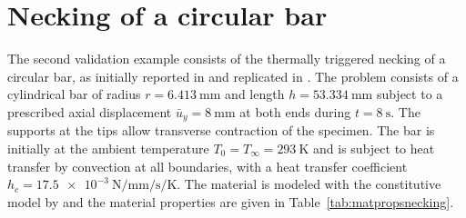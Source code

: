 \section{Necking of a circular bar}
\label{sec:mech-driv-probl}

The second validation example consists of the thermally triggered necking of a circular bar, as initially reported in \cite{simo_associative_1992} and replicated in \cite{danowski_computational_2014}.
The problem consists of a cylindrical bar of radius $r=\SI{6.413}{\milli\meter}$ and length $h=\SI{53.334}{\milli\meter}$ subject to a prescribed axial displacement $\bar{u}_{y}=\SI{8}{\milli\meter}$ at both ends during $t=\SI{8}{\second}$.
The supports at the tips allow transverse contraction of the specimen.
The bar is initially at the ambient temperature $T_{0}=T_{\infty}=\SI{293}{\kelvin}$ and is subject to heat transfer by convection at all boundaries, with a heat transfer coefficient $h_{c} = \SI{17.5e-3}{\newton\per\milli\meter\per\second\per\kelvin}$.
The material is modeled with the constitutive model by \cite{simo_associative_1992} and the material properties are given in Table~\ref{tab:matpropsnecking}.
%
